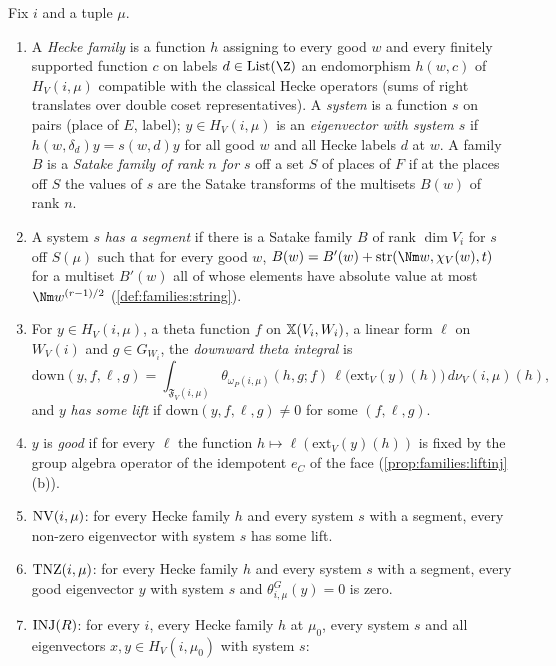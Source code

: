 \begin{definition}\label{pf:liftinj:realdefs}
Fix $i$ and a tuple $\mu$.
\begin{enumerate}[label=(\alph*)]
\item A \emph{Hecke family} is a function $h$ assigning to every good $w$ and every finitely supported function $c$ on labels $d\in\mathrm{List}(\Z)$
an endomorphism $h(w,c)$ of $H_V(i,\mu)$ compatible with the classical Hecke operators (sums of right translates over double coset
representatives). A \emph{system} is a function $s$ on pairs (place of $E$, label); $y\in H_V(i,\mu)$ is an \emph{eigenvector with system $s$} if
$h(w,\delta_d)y=s(w,d)y$ for all good $w$ and all Hecke labels $d$ at $w$. A family $B$ is a \emph{Satake family of rank $n$ for $s$} off a set $S$ of
places of $F$ if at the places off $S$ the values of $s$ are the Satake transforms of the multisets $B(w)$ of rank $n$.
\item A system $s$ \emph{has a segment} if there is a Satake family $B$ of rank $\dim V_i$ for $s$ off $S(\mu)$ such that for every good $w$,
$B(w)=B'(w)+\liftinjstr(\Nm w,\chi_V(w),t)$ for a multiset $B'(w)$ all of whose elements have absolute value at most $\Nm w^{(r-1)/2}$
(\cref{def:families:string}).
\item For $y\in H_V(i,\mu)$, a theta function $f$ on $\mathbb{X}(V_i,W_i)$, a linear form $\ell$ on $W_V(i)$ and $g\in G_{W_i}$, the \emph{downward theta
integral} is
\begin{equation}\label{eq:pf:liftinj:downint}
\mathrm{down}(y,f,\ell,g)=\int_{\mathfrak F_V(i,\mu)}\theta_{\omega_P(i,\mu)}(h,g;f)\,\ell\bigl(\mathrm{ext}_V(y)(h)\bigr)\,d\nu_V(i,\mu)(h),
\end{equation}
and $y$ \emph{has some lift} if $\mathrm{down}(y,f,\ell,g)\ne0$ for some $(f,\ell,g)$.
\item $y$ is \emph{good} if for every $\ell$ the function $h\mapsto\ell(\mathrm{ext}_V(y)(h))$ is fixed by the group algebra operator of the
idempotent $e_C$ of the face (\cref{prop:families:liftinj}(b)).
\item $\mathrm{NV}(i,\mu)$: for every Hecke family $h$ and every system $s$ with a segment, every non-zero eigenvector with system $s$ has some lift.
\item $\mathrm{TNZ}(i,\mu)$: for every Hecke family $h$ and every system $s$ with a segment, every good eigenvector $y$ with system $s$ and
$\theta^G_{i,\mu}(y)=0$ is zero.
\item $\mathrm{INJ}(R)$: for every $i$, every Hecke family $h$ at $\mu_0$, every system $s$ and all eigenvectors $x,y\in H_V(i,\mu_0)$ with system $s$:

\end{enumerate}
\end{definition}
